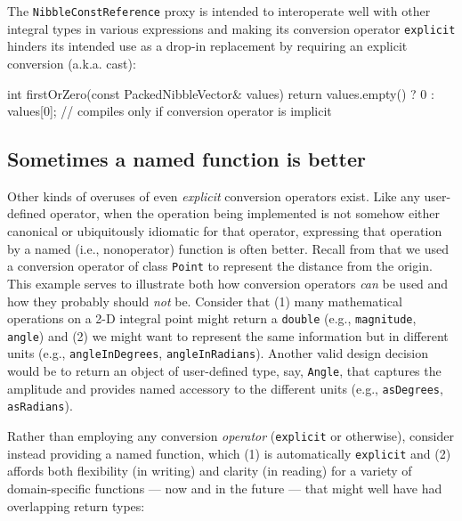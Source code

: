 \noindent The \lstinline!NibbleConstReference! proxy is intended to interoperate well with other integral types in various expressions and making its conversion operator \lstinline!explicit! hinders its intended use as a drop-in replacement by requiring an explicit conversion (a.k.a. cast):

\begin{emcppslisting}[emcppsbatch=e3]
int firstOrZero(const PackedNibbleVector& values)
{
    return values.empty() 
        ? 0 
        : values[0]; // compiles only if conversion operator is implicit
}
\end{emcppslisting}


\subsection[Sometimes a named function is better]{Sometimes a named function is better}\label{sometimes-a-named-function-is-better}

Other kinds of overuses of even \emph{explicit} conversion
operators exist. Like any user-defined operator, when the operation being
implemented is not somehow either canonical or ubiquitously idiomatic
for that operator, expressing that operation by a
named (i.e., nonoperator) function is often better. Recall from  
that we used a conversion operator of
class \lstinline!Point! to represent the distance from the origin. This
example serves to illustrate both how conversion operators \emph{can} be
used and how they probably should \emph{not} be. Consider that (1)
many mathematical operations on a 2-D integral point might return a \lstinline!double! (e.g., \lstinline!magnitude!,
\lstinline!angle!) and (2) we might want to represent the same
information but in different units (e.g., \lstinline!angleInDegrees!,
\lstinline!angleInRadians!). Another valid design
decision would be to return an object of user-defined type, say, \lstinline!Angle!, that captures
the amplitude and provides named accessory to the different units
  (e.g., \lstinline!asDegrees!, \lstinline!asRadians!).

Rather than employing any conversion \emph{operator} (\lstinline!explicit!
or otherwise), consider instead providing a named function, which (1) is
automatically \lstinline!explicit! and (2) affords both flexibility (in
writing) and clarity (in reading) for a variety of domain-specific
functions --- now and in the future --- that might well have had
overlapping return types:

